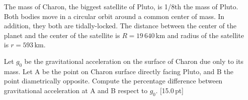 The mass of Charon, the biggest satellite of Pluto, is 1/8th the mass of
Pluto. Both bodies move in a circular orbit around a common center of mass. In
addition, they both are tidally-locked. The distance between the center of the
planet and the center of the satellite is $R = 19\,640$\,km and radius of the
satellite is $r = 593$\,km.

Let $g_0$ be the gravitational acceleration on the surface of Charon due only
to its mass. Let A be the point on Charon surface directly facing Pluto, and B
the point diametrically opposite. Compute the percentage difference between
gravitational acceleration at A and B respect to $g_0$. \hfill[15.0\,pt]
